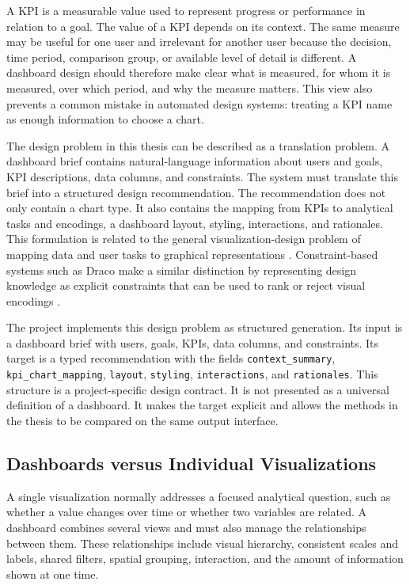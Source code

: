 A KPI is a measurable value used to represent progress or performance in relation to a goal. The value of a KPI depends on its context. The same measure may be useful for one user and irrelevant for another user because the decision, time period, comparison group, or available level of detail is different. A dashboard design should therefore make clear what is measured, for whom it is measured, over which period, and why the measure matters. This view also prevents a common mistake in automated design systems: treating a KPI name as enough information to choose a chart.

The design problem in this thesis can be described as a translation problem. A dashboard brief contains natural-language information about users and goals, KPI descriptions, data columns, and constraints. The system must translate this brief into a structured design recommendation. The recommendation does not only contain a chart type. It also contains the mapping from KPIs to analytical tasks and encodings, a dashboard layout, styling, interactions, and rationales. This formulation is related to the general visualization-design problem of mapping data and user tasks to graphical representations \cite{mackinlay1986apt,munzner2014visualization}. Constraint-based systems such as Draco make a similar distinction by representing design knowledge as explicit constraints that can be used to rank or reject visual encodings \cite{moritz2019draco}.

The project implements this design problem as structured generation. Its input is a dashboard brief with users, goals, KPIs, data columns, and constraints. Its target is a typed recommendation with the fields \texttt{context\_summary}, \texttt{kpi\_chart\_mapping}, \texttt{layout}, \texttt{styling}, \texttt{interactions}, and \texttt{rationales}. This structure is a project-specific design contract. It is not presented as a universal definition of a dashboard. It makes the target explicit and allows the methods in the thesis to be compared on the same output interface.

\subsection{Dashboards versus Individual Visualizations}

A single visualization normally addresses a focused analytical question, such as whether a value changes over time or whether two variables are related. A dashboard combines several views and must also manage the relationships between them. These relationships include visual hierarchy, consistent scales and labels, shared filters, spatial grouping, interaction, and the amount of information shown at one time.

